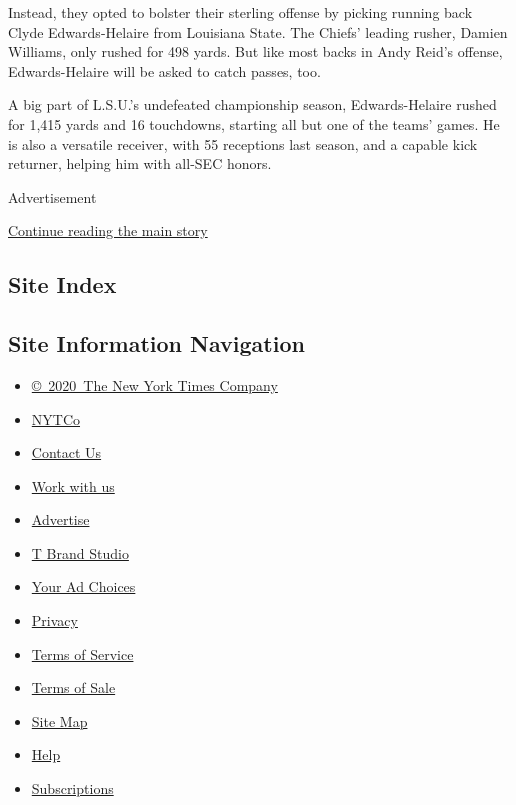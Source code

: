 Instead, they opted to bolster their sterling offense by picking running
back Clyde Edwards-Helaire from Louisiana State. The Chiefs' leading
rusher, Damien Williams, only rushed for 498 yards. But like most backs
in Andy Reid's offense, Edwards-Helaire will be asked to catch passes,
too.

A big part of L.S.U.'s undefeated championship season, Edwards-Helaire
rushed for 1,415 yards and 16 touchdowns, starting all but one of the
teams' games. He is also a versatile receiver, with 55 receptions last
season, and a capable kick returner, helping him with all-SEC honors.

Advertisement

\protect\hyperlink{after-bottom}{Continue reading the main story}

\hypertarget{site-index}{%
\subsection{Site Index}\label{site-index}}

\hypertarget{site-information-navigation}{%
\subsection{Site Information
Navigation}\label{site-information-navigation}}

\begin{itemize}
\tightlist
\item
  \href{https://help.nytimes3xbfgragh.onion/hc/en-us/articles/115014792127-Copyright-notice}{©~2020~The
  New York Times Company}
\end{itemize}

\begin{itemize}
\tightlist
\item
  \href{https://www.nytco.com/}{NYTCo}
\item
  \href{https://help.nytimes3xbfgragh.onion/hc/en-us/articles/115015385887-Contact-Us}{Contact
  Us}
\item
  \href{https://www.nytco.com/careers/}{Work with us}
\item
  \href{https://nytmediakit.com/}{Advertise}
\item
  \href{http://www.tbrandstudio.com/}{T Brand Studio}
\item
  \href{https://www.nytimes3xbfgragh.onion/privacy/cookie-policy\#how-do-i-manage-trackers}{Your
  Ad Choices}
\item
  \href{https://www.nytimes3xbfgragh.onion/privacy}{Privacy}
\item
  \href{https://help.nytimes3xbfgragh.onion/hc/en-us/articles/115014893428-Terms-of-service}{Terms
  of Service}
\item
  \href{https://help.nytimes3xbfgragh.onion/hc/en-us/articles/115014893968-Terms-of-sale}{Terms
  of Sale}
\item
  \href{https://spiderbites.nytimes3xbfgragh.onion}{Site Map}
\item
  \href{https://help.nytimes3xbfgragh.onion/hc/en-us}{Help}
\item
  \href{https://www.nytimes3xbfgragh.onion/subscription?campaignId=37WXW}{Subscriptions}
\end{itemize}
